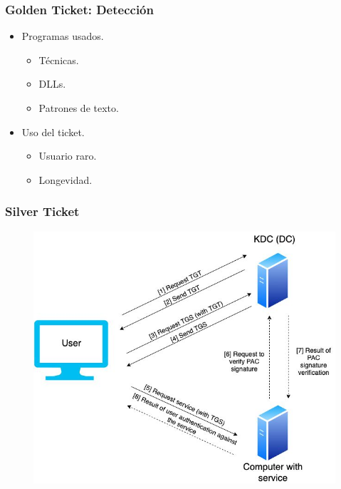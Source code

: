 \documentclass[a4paper,10pt]{beamer}
\newcommand{\linej}{\hfill\break}
\begin{document}
\begin{frame}[fragile]
	\frametitle{Golden Ticket: Detección}

	\begin{itemize}
		\item Programas usados. %
		\begin{itemize}
			\item Técnicas. %
			\item DLLs. %
			\item Patrones de texto. %
		\end{itemize}
		\linej
		\item Uso del ticket. %
		\begin{itemize}
			\item Usuario raro.
			\item Longevidad. %
		\end{itemize}
	\end{itemize}
\end{frame}

\begin{frame}[fragile]
	\frametitle{Silver Ticket}

	\begin{figure}[H]
		\centering
		\includegraphics[width=.8\textwidth]{../figuras/TGT_TGS_PAC.jpg}
	\end{figure}

\end{frame}
\end{document}

